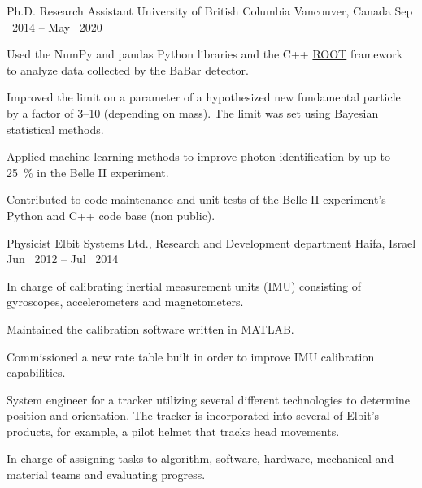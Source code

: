 

\begin{cventries}

    \cventryWithTags
    {Ph.D. Research Assistant} %
    {University of British Columbia} %
    {Vancouver, Canada} %
    {Sep \ 2014 -- May \ 2020} %
    {         \fbox{\LaTeX}} %
    {
      \begin{cvitems} %
      \item {Used the NumPy and pandas Python libraries and the C++ \hypersetup{urlcolor=blue}\href{https://root.cern.ch/}{ROOT} framework to analyze data collected by the BaBar detector.}
      \item {Improved the limit on a parameter of a hypothesized new fundamental particle by a factor of 3--10 (depending on mass). The limit was set using Bayesian statistical methods.}
        \item {Applied machine learning methods to improve photon identification by up to \SI{25}{\percent} in the Belle II experiment.}
        \item {Contributed to code maintenance and unit tests of the Belle II experiment's Python and C++ code base (non public).}
      \end{cvitems}
    }

    \cventryWithTags
    {Physicist} %
    {Elbit Systems Ltd., Research and Development department} %
    {Haifa, Israel} %
    {Jun \ 2012 -- Jul \ 2014} %
    {  }
    {
      \begin{cvitems} %
        \item {In charge of calibrating inertial measurement units (IMU) consisting of gyroscopes, accelerometers and magnetometers.}
        \item {Maintained the calibration software written in MATLAB.}
        \item {Commissioned a new rate table built in order to improve IMU calibration capabilities.}
        \item {System engineer for a tracker utilizing several different
          technologies to determine position and orientation. The tracker is incorporated into several of Elbit's products, for example, a pilot helmet that tracks head movements.}
        \item {In charge of assigning tasks to algorithm, software, hardware, mechanical and material teams and evaluating progress.}
      \end{cvitems}
    }


\end{cventries}
